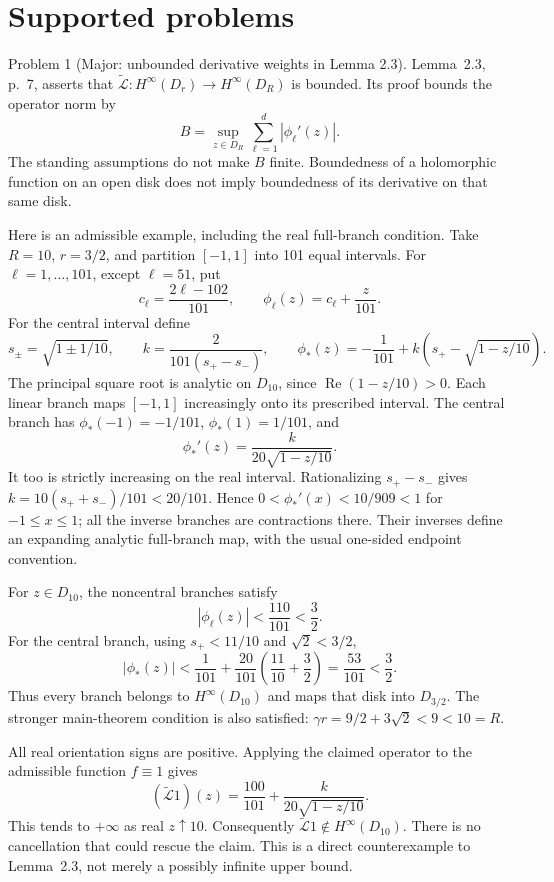 \documentclass[10pt]{article}
\begin{document}
\section*{Supported problems}
Problem 1 (Major: unbounded derivative weights in Lemma 2.3).  Lemma 2.3, p. 7, asserts that \(\widetilde{\mathcal L}:H^\infty(D_r)\to H^\infty(D_R)\) is bounded. Its proof bounds the operator norm by \[B=\sup_{z\in D_R}\sum_{\ell=1}^d|\phi_\ell'(z)|.\] The standing assumptions do not make \(B\) finite. Boundedness of a holomorphic function on an open disk does not imply boundedness of its derivative on that same disk.\par
Here is an admissible example, including the real full-branch condition. Take \(R=10\), \(r=3/2\), and partition \([-1,1]\) into 101 equal intervals. For \(\ell=1,\ldots,101\), except \(\ell=51\), put \[c_\ell=\frac{2\ell-102}{101},\qquad
 \phi_\ell(z)=c_\ell+\frac{z}{101}.\] For the central interval define \[s_\pm=\sqrt{1\pm 1/10},\qquad
 k=\frac{2}{101(s_+-s_-)},\qquad
 \phi_*(z)=-\frac1{101}
       +k\left(s_+-\sqrt{1-z/10}\right).
 \tag{3.1}\] The principal square root is analytic on \(D_{10}\), since \(\operatorname{Re}(1-z/10)>0\). Each linear branch maps \([-1,1]\) increasingly onto its prescribed interval. The central branch has \(\phi_*(-1)=-1/101\), \(\phi_*(1)=1/101\), and \[\phi_*'(z)=\frac{k}{20\sqrt{1-z/10}}.
 \tag{3.2}\] It too is strictly increasing on the real interval. Rationalizing \(s_+-s_-\) gives \(k=10(s_++s_-)/101<20/101\). Hence \(0<\phi_*'(x)<10/909<1\) for \(-1\le x\le1\); all the inverse branches are contractions there. Their inverses define an expanding analytic full-branch map, with the usual one-sided endpoint convention.\par
For \(z\in D_{10}\), the noncentral branches satisfy \[|\phi_\ell(z)|<\frac{110}{101}<\frac32.\] For the central branch, using \(s_+<11/10\) and \(\sqrt2<3/2\), \[|\phi_*(z)|
 <\frac1{101}+\frac{20}{101}\left(\frac{11}{10}+\frac32\right)
 =\frac{53}{101}<\frac32.\] Thus every branch belongs to \(H^\infty(D_{10})\) and maps that disk into \(D_{3/2}\). The stronger main-theorem condition is also satisfied: \(\gamma r=9/2+3\sqrt2<9<10=R\).\par
All real orientation signs are positive. Applying the claimed operator to the admissible function \(f\equiv1\) gives \[(\widetilde{\mathcal L}1)(z)=\frac{100}{101}
                  +\frac{k}{20\sqrt{1-z/10}}.\] This tends to \(+\infty\) as real \(z\uparrow10\). Consequently \(\widetilde{\mathcal L}1\notin H^\infty(D_{10})\). There is no cancellation that could rescue the claim. This is a direct counterexample to Lemma 2.3, not merely a possibly infinite upper bound.\par
\end{document}
